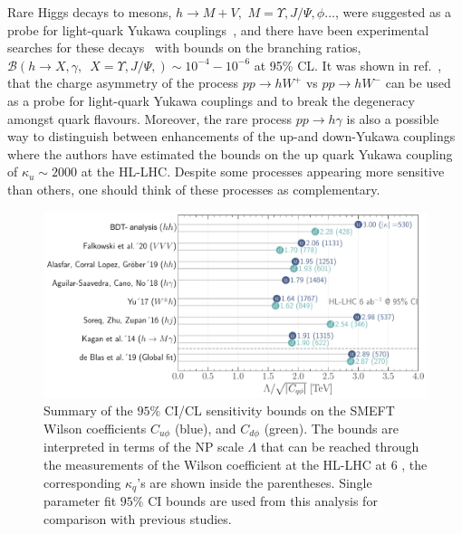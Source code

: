 \par Rare Higgs decays to mesons, $h \to M +V ,\, \, M = \Upsilon, J/\Psi, \phi\dots$, were suggested as a probe for light-quark Yukawa couplings~\cite{Bodwin:2013gca,Kagan:2014ila,Konig:2015qat}, and there have been experimental searches for these decays~\cite{ATLAS-CONF-2021-021,CMS:2018gcm} with bounds on the branching ratios, $\mathcal{B} (h \to X, \gamma, \,\,\, X =\Upsilon, J/\Psi,  ) \sim 10^{-4} - 10^{-6}$ at 95\% CL. It was shown in ref.~\cite{Yu:2017vul}, that the charge asymmetry of the process $pp \to h W^+$ vs $ pp \to h W^-$ can be used as a probe for light-quark Yukawa couplings and to break the degeneracy amongst quark flavours. Moreover, the rare process $ pp \to h \gamma$ is also a possible way to distinguish between enhancements of the up-and down-Yukawa couplings~\cite{Aguilar-Saavedra:2020rgo} where the authors have estimated the bounds on the up quark Yukawa coupling of $\kappa_u\sim 2000$ at the HL-LHC. Despite some processes appearing more sensitive than others, one should think of these processes as complementary. 
\begin{figure}[t!]
	\includegraphics[width=\linewidth]{figures/ueberblick_ly.pdf}
	\caption{Summary of the $95\%$ CI/CL sensitivity bounds on the SMEFT Wilson coefficients $C_{u\phi}$ (blue), and $C_{d\phi}$ (green). The bounds are interpreted in terms of the NP scale $\Lambda$ that can be reached through the measurements of the Wilson coefficient at the HL-LHC at $6$ \invab, the corresponding $\kappa_q$'s are shown inside the parentheses. Single parameter fit $95\%$ CI bounds are used from this analysis for comparison with previous studies.}
	\label{fig:comparison}
\end{figure}
